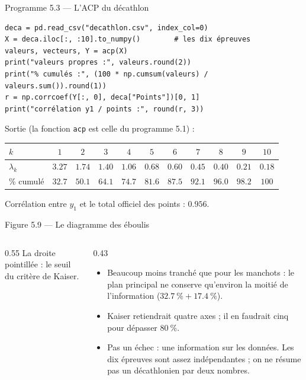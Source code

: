 \begin{frame}[fragile]{Programme 5.3 --- L'ACP du décathlon}
\begin{lstlisting}
deca = pd.read_csv("decathlon.csv", index_col=0)
X = deca.iloc[:, :10].to_numpy()        # les dix épreuves
valeurs, vecteurs, Y = acp(X)
print("valeurs propres :", valeurs.round(2))
print("% cumulés :", (100 * np.cumsum(valeurs) / valeurs.sum()).round(1))
r = np.corrcoef(Y[:, 0], deca["Points"])[0, 1]
print("corrélation y1 / points :", round(r, 3))
\end{lstlisting}
  \vspace{4pt}
  \small Sortie (la fonction \texttt{acp} est celle du programme 5.1) :
  \begin{center}
    \footnotesize
    \begin{tabular}{lcccccccccc}
      \toprule
      $k$ & $1$ & $2$ & $3$ & $4$ & $5$ & $6$ & $7$ & $8$ & $9$ & $10$ \\
      \midrule
      $\lambda_k$ & $\num{3.27}$ & $\num{1.74}$ & $\num{1.40}$ & $\num{1.06}$ & $\num{0.68}$ & $\num{0.60}$ & $\num{0.45}$ & $\num{0.40}$ & $\num{0.21}$ & $\num{0.18}$ \\
      \% cumulé & $\num{32.7}$ & $\num{50.1}$ & $\num{64.1}$ & $\num{74.7}$ & $\num{81.6}$ & $\num{87.5}$ & $\num{92.1}$ & $\num{96.0}$ & $\num{98.2}$ & $100$ \\
      \bottomrule
    \end{tabular}
  \end{center}
  Corrélation entre $y_1$ et le total officiel des points : $\num{0.956}$.
\end{frame}

\begin{frame}{Figure 5.9 --- Le diagramme des éboulis}
  \begin{columns}[c]
    \begin{column}{0.55\textwidth}
      \scriptsize La droite pointillée : le seuil du critère de Kaiser.
    \end{column}
    \begin{column}{0.43\textwidth}
      \small
      \begin{itemize}
        \item Beaucoup moins tranché que pour les manchots : le plan
          principal ne conserve qu'environ la moitié de l'information
          ($\SI{32.7}{\percent}+\SI{17.4}{\percent}$).
        \item Kaiser retiendrait quatre axes ; il en faudrait cinq pour
          dépasser $\SI{80}{\percent}$.
        \item Pas un échec : une information sur les données. Les dix
          épreuves sont assez indépendantes ; on ne résume pas un
          décathlonien par deux nombres.
      \end{itemize}
    \end{column}
  \end{columns}
\end{frame}

